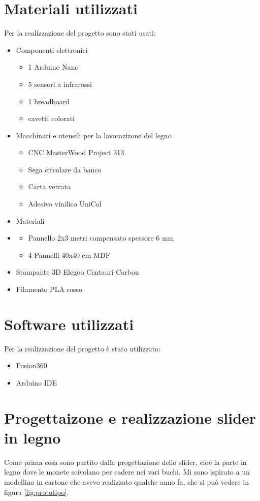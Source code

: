 \documentclass{article}
\begin{document}
\section{Materiali utilizzati}
Per la realizzazione del progetto sono stati usati:
\begin{itemize}
    \item Componenti elettronici
    \begin{itemize}
        \item 1 Arduino Nano
        \item 5 sensori a infrarossi
        \item 1 breadboard
        \item cavetti colorati
    \end{itemize}
    \item Macchinari e utensili per la lavorazizone del legno
    \begin{itemize}
        \item CNC MasterWood Project 313
        \item Sega circolare da banco
        \item Carta vetrata
        \item Adesivo vinilico UniCol
    \end{itemize}
    \item Materiali
    \item \begin{itemize}
        \item Pannello 2x3 metri compensato spessore 6 mm
        \item 4 Pannelli 40x40 cm MDF
    \end{itemize}
    \item Stampante 3D Elegoo Centauri Carbon
    \item Filamento PLA rosso
\end{itemize}

\section{Software utilizzati}
Per la realizzazione del progetto è stato utilizzato:
\begin{itemize}
    \item Fusion360
    \item Arduino IDE
\end{itemize}

\section{Progettaizone e realizzazione slider in legno}
Come prima cosa sono partito dalla progettazione dello slider, cioè la parte in legno dove le monete scivolano per cadere nei vari buchi.
Mi sono ispirato a un modellino in cartone che avevo realizzato qualche anno fa, che si può vedere in figura \ref{fig:prototipo}.
\end{document}
